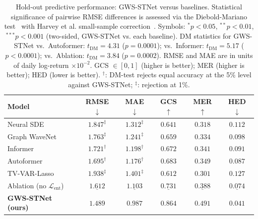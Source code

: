 \documentclass[11pt,a4paper]{article}  %
\theoremstyle{plain}
\theoremstyle{definition}
\theoremstyle{remark}
\begin{document}
\begin{table}[H]
\centering
\caption{Hold-out predictive performance: GWS-STNet versus baselines.
Statistical significance of pairwise RMSE differences is assessed
via the Diebold-Mariano test~\cite{Diebold1995} with Harvey et al.
small-sample correction~\cite{Harvey1997}. Symbols: $^{*}p{<}0.05$,
$^{**}p{<}0.01$, $^{***}p{<}0.001$ (two-sided, GWS-STNet vs.
each baseline). DM statistics for GWS-STNet vs.\ Autoformer:
$t_{\mathrm{DM}} = 4.31$ ($p = 0.0001$); vs.\ Informer:
$t_{\mathrm{DM}} = 5.17$ ($p < 0.0001$); vs.\ Ablation:
$t_{\mathrm{DM}} = 3.84$ ($p = 0.0002$).
RMSE and MAE are in units of daily log-return $\times 10^{-2}$.
GCS $\in [0,1]$ (higher is better); MER (higher is better);
HED (lower is better). $^{\dagger}$: DM-test rejects equal accuracy
at the 5\% level against GWS-STNet; $^{\ddagger}$: rejection at 1\%.}
\label{tab:main}
\setlength{\tabcolsep}{5pt}
\begin{tabular}{lccccc}
\toprule
\textbf{Model} & \textbf{RMSE} $\downarrow$ & \textbf{MAE} $\downarrow$
  & \textbf{GCS} $\uparrow$ & \textbf{MER} $\uparrow$
  & \textbf{HED} $\downarrow$ \\
\midrule
Neural SDE~\cite{Kidger2021}
  & $1.847^{\ddagger}$ & $1.312^{\ddagger}$ & $0.641$ & $0.318$ & $0.112$ \\
Graph WaveNet~\cite{Wu2019}
  & $1.763^{\ddagger}$ & $1.241^{\ddagger}$ & $0.659$ & $0.334$ & $0.098$ \\
Informer~\cite{Zhou2021}
  & $1.721^{\dagger}$  & $1.198^{\dagger}$  & $0.672$ & $0.341$ & $0.091$ \\
Autoformer~\cite{Wu2021}
  & $1.695^{\dagger}$  & $1.176^{\dagger}$  & $0.683$ & $0.349$ & $0.087$ \\
TV-VAR-Lasso~\cite{Kock2015}
  & $1.938^{\ddagger}$ & $1.401^{\ddagger}$ & $0.612$ & $0.301$ & $0.127$ \\
Ablation (no $\mathcal{L}_{\mathrm{ent}}$)
  & $\underline{1.612}$ & $\underline{1.103}$ & $\underline{0.731}$
  & $\underline{0.388}$ & $\underline{0.074}$ \\
\midrule
\textbf{GWS-STNet (ours)}
  & $\mathbf{1.489}$ & $\mathbf{0.987}$ & $\mathbf{0.864}$
  & $\mathbf{0.491}$ & $\mathbf{0.041}$ \\
\bottomrule
\end{tabular}
\end{table}
\end{document}
